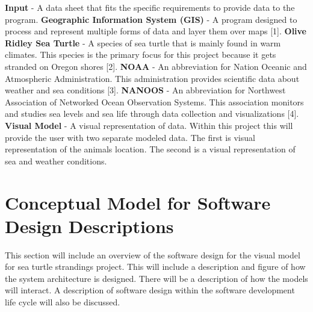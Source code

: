 \documentclass[onecolumn, draftclsnofoot,10pt, compsoc]{IEEEtran}
\begin{document}
\begin{singlespace}
    \textbf{Input} - A data sheet that fits the specific requirements to provide data to the program.\newline \newline
     \textbf{Geographic Information System (GIS)} - A program designed to process and represent multiple forms of data and layer them over maps [1]. \newline \newline
    \textbf{Olive Ridley Sea Turtle} - A species of sea turtle that is mainly found in warm climates. This species is the primary focus for this project because it gets stranded on Oregon shores [2]. \newline \newline
    \textbf{NOAA} - An abbreviation for Nation Oceanic and Atmospheric Administration. This administration provides scientific data about weather and sea conditions [3]. \newline \newline
    \textbf{NANOOS} - An abbreviation for Northwest Association of Networked Ocean Observation Systems.  This association monitors and studies sea levels and sea life through data collection and visualizations [4]. \newline \newline
    \textbf{Visual Model} - A visual representation of data. Within this project this will provide the user with two separate modeled data. The first is visual representation of the animals location. The second is a visual representation of sea and weather conditions. \newline \newline
   
    
    
\pagebreak  

\section{Conceptual Model for Software Design Descriptions}
This section will include an overview of the software design for the visual model for sea turtle strandings project. This will include a description and figure of how the system architecture is designed. There will be a description of how the models will interact. A description of software design within the software development life cycle will also be discussed. 
        

\end{singlespace}
\end{document}

